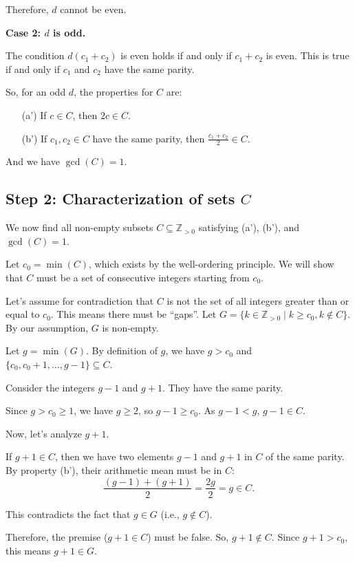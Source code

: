 \documentclass[12pt,a4paper]{article}
\theoremstyle{definition}
\begin{document}
        Therefore, $d$ cannot be even.

        \textbf{Case 2: $d$ is odd.}

        The condition $d(c_1+c_2)$ is even holds if and only if $c_1+c_2$ is even. This is true if and only if $c_1$ and $c_2$ have the same parity.

        So, for an odd $d$, the properties for $C$ are:
        \begin{enumerate}
            \item[(a')] If $c \in C$, then $2c \in C$.
            \item[(b')] If $c_1, c_2 \in C$ have the same parity, then $\frac{c_1+c_2}{2} \in C$.
        \end{enumerate}
        And we have $\gcd(C)=1$.

        \subsection*{Step 2: Characterization of sets $C$}

        We now find all non-empty subsets $C \subseteq \mathbb{Z}_{>0}$ satisfying (a'), (b'), and $\gcd(C)=1$.

        Let $c_0 = \min(C)$, which exists by the well-ordering principle. We will show that $C$ must be a set of consecutive integers starting from $c_0$.

        Let's assume for contradiction that $C$ is not the set of all integers greater than or equal to $c_0$. This means there must be ``gaps''. Let $G = \{k \in \mathbb{Z}_{>0} \mid k \geq c_0, k \notin C\}$. By our assumption, $G$ is non-empty.

        Let $g = \min(G)$. By definition of $g$, we have $g > c_0$ and $\{c_0, c_0+1, \ldots, g-1\} \subseteq C$.

        Consider the integers $g-1$ and $g+1$. They have the same parity.

        Since $g > c_0 \geq 1$, we have $g \geq 2$, so $g-1 \geq c_0$. As $g-1 < g$, $g-1 \in C$.

        Now, let's analyze $g+1$.

        If $g+1 \in C$, then we have two elements $g-1$ and $g+1$ in $C$ of the same parity. By property (b'), their arithmetic mean must be in $C$:
        $$\frac{(g-1) + (g+1)}{2} = \frac{2g}{2} = g \in C.$$

        This contradicts the fact that $g \in G$ (i.e., $g \notin C$).

        Therefore, the premise ($g+1 \in C$) must be false. So, $g+1 \notin C$. Since $g+1 > c_0$, this means $g+1 \in G$.
\end{document}
